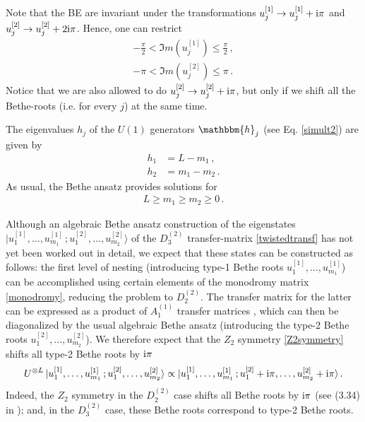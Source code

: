 \documentclass[12pt]{article}
\numberwithin{equation}{section}
\newcommand{\BR}[2]{u^{[#1]}_{#2}}
\newcommand{\ri}{{\rm i}}
\begin{document}
Note that the BE are invariant under the  transformations $\BR{1}{j}\to \BR{1}{j}+\ri \pi$ and $\BR{2}{j}\to \BR{2}{j}+2\ri \pi$. Hence, one can restrict 
\begin{align}
    -\frac{\pi}{2}<\Im m(\BR{1}{j})\leq\frac{\pi}{2} \,, \\
      -\pi<\Im m(\BR{2}{j})\leq\pi \,.
\end{align}
Notice that we are also allowed to do $\BR{2}{j}\to \BR{2}{j}+\ri \pi $, but only if we shift all the Bethe-roots (i.e. for every $j$) at the same time.

The eigenvalues $h_j$ of the $U(1)$ generators $\mathbbm{h}_j$ (see Eq. \eqref{simult2}) are given by \cite{Resh87}
\begin{equation}
\label{hvals}
\begin{aligned}
    h_1&=L-m_1 \,, \\
    h_2&=m_1-m_2 \,.
\end{aligned}
\end{equation}
As usual, the Bethe ansatz provides solutions for 
\begin{align}
     L\ge m_1\ge m_2\ge0 \,.
     \label{NumBRConstraint}
\end{align}

Although an algebraic Bethe ansatz construction of the eigenstates $| u^{[1]}_1, \ldots, u^{[1]}_{m_1}\,; u^{[2]}_1, \ldots, u^{[2]}_{m_2} \rangle$ of the $D^{(2)}_3$ transfer-matrix \eqref{twistedtransf} has not yet been worked out in detail, we expect that these states can be constructed as follows: the first level of nesting (introducing type-1 Bethe roots $u^{[1]}_1, \ldots, u^{[1]}_{m_1}$) can be accomplished \cite{Mart99} using certain elements of the monodromy matrix \eqref{monodromy}, reducing the problem to $D^{(2)}_2$. The transfer matrix for the latter can be expressed as a product of $A^{(1)}_1$ transfer matrices \cite{NeRe21a}, which can then be diagonalized by the usual algebraic Bethe ansatz (introducing the type-2 Bethe roots $u^{[2]}_1, \ldots, u^{[2]}_{m_2} $). 
We therefore expect that the $Z_2$ symmetry \eqref{Z2symmetry} shifts all type-2 Bethe roots by $\ri \pi$
\begin{equation}
U^{\otimes L}\, | u^{[1]}_1, \ldots, u^{[1]}_{m_1}\,; u^{[2]}_1, \ldots, u^{[2]}_{m_2} \rangle \propto | u^{[1]}_1, \ldots, u^{[1]}_{m_1}\,; u^{[2]}_1 + \ri\pi, \ldots, u^{[2]}_{m_2} + \ri\pi \rangle \,.
\label{shiftconjecture}
\end{equation}
Indeed, the $Z_2$ symmetry in the $D^{(2)}_2$ case shifts all Bethe roots by $ \ri \pi$ (see (3.34) in \cite{NeRe21a}); and, in the $D^{(2)}_3$ case, these Bethe roots correspond to type-2 Bethe roots.
\end{document}
